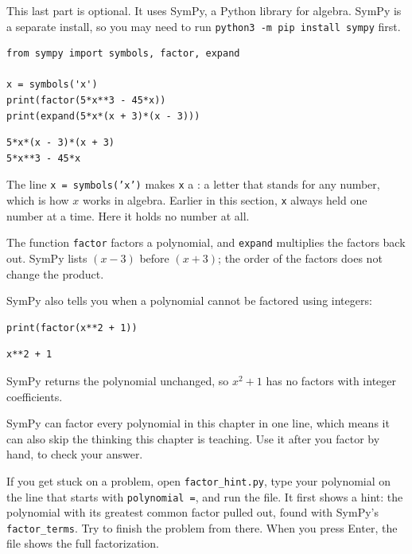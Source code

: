 
This last part is optional. It uses SymPy, a Python library for
algebra. SymPy is a separate install, so you may need to run
\texttt{python3 -m pip install sympy} first.

\begin{verbatim}
from sympy import symbols, factor, expand

x = symbols('x')
print(factor(5*x**3 - 45*x))
print(expand(5*x*(x + 3)*(x - 3)))
\end{verbatim}

\begin{verbatim}
5*x*(x - 3)*(x + 3)
5*x**3 - 45*x
\end{verbatim}

The line \texttt{x = symbols('x')} makes \texttt{x}
a : a letter that
stands for any number, which is how $x$ works in algebra. Earlier in this
section, \texttt{x} always held one number at a time. Here
it holds no number at all.

The function \texttt{factor} factors a polynomial, and
\texttt{expand} multiplies the factors back out. SymPy lists
$(x - 3)$ before $(x + 3)$; the order of the factors does not change
the product.

SymPy also tells you when a polynomial cannot be factored using
integers:

\begin{verbatim}
print(factor(x**2 + 1))
\end{verbatim}

\begin{verbatim}
x**2 + 1
\end{verbatim}

SymPy returns the polynomial unchanged, so $x^2 + 1$ has no factors
with integer coefficients.

SymPy can factor every polynomial in this chapter in one line, which
means it can also skip the thinking this chapter is teaching. Use it
after you factor by hand, to check your answer.

If you get stuck on a problem, open
\texttt{factor_hint.py}, type your polynomial
on the line that starts with \texttt{polynomial =}, and run
the file. It first shows a hint: the polynomial with its greatest common
factor pulled out, found with SymPy's \texttt{factor_terms}.
Try to finish the problem from there. When you press Enter, the file
shows the full factorization.


